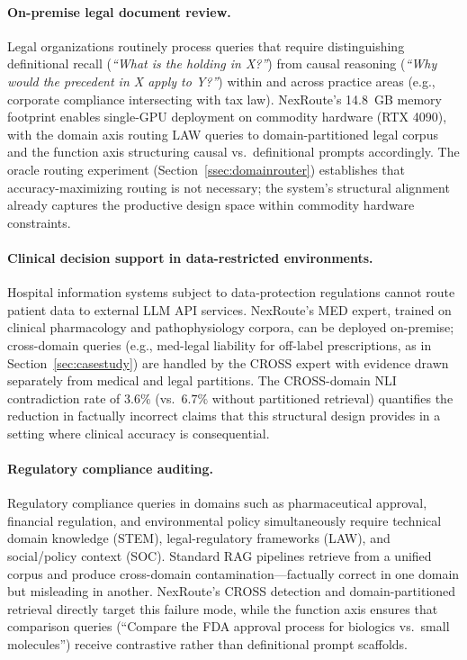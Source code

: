 \documentclass[a4paper,fleql,doubleblind]{cas-sc}
\begin{document}
\paragraph{On-premise legal document review.}
Legal organizations routinely process queries that require distinguishing definitional
recall (\textit{``What is the holding in X?''}) from causal reasoning
(\textit{``Why would the precedent in X apply to Y?''}) within and across practice
areas (e.g., corporate compliance intersecting with tax law).
NexRoute's 14.8~GB memory footprint enables single-GPU deployment on commodity hardware
(RTX 4090), with the domain axis routing LAW queries to domain-partitioned legal
corpus and the function axis structuring causal vs.\ definitional prompts
accordingly.
The oracle routing experiment (Section~\ref{ssec:domainrouter}) establishes that
accuracy-maximizing routing is not necessary; the system's structural alignment
already captures the productive design space within commodity hardware constraints.

\paragraph{Clinical decision support in data-restricted environments.}
Hospital information systems subject to data-protection regulations cannot route
patient data to external LLM API services.
NexRoute's MED expert, trained on clinical pharmacology and pathophysiology corpora,
can be deployed on-premise; cross-domain queries (e.g., med-legal liability for
off-label prescriptions, as in Section~\ref{sec:casestudy}) are handled by the
CROSS expert with evidence drawn separately from medical and legal partitions.
The CROSS-domain NLI contradiction rate of $3.6\%$ (vs.\ $6.7\%$ without partitioned
retrieval) quantifies the reduction in factually incorrect claims that this structural
design provides in a setting where clinical accuracy is consequential.

\paragraph{Regulatory compliance auditing.}
Regulatory compliance queries in domains such as pharmaceutical approval,
financial regulation, and environmental policy simultaneously require technical
domain knowledge (STEM), legal-regulatory frameworks (LAW), and social/policy
context (SOC). Standard RAG pipelines retrieve from a unified corpus and produce
cross-domain contamination---factually correct in one domain but misleading in
another. NexRoute's CROSS detection and domain-partitioned retrieval directly
target this failure mode, while the function axis ensures that comparison queries
(``Compare the FDA approval process for biologics vs.\ small molecules'') receive
contrastive rather than definitional prompt scaffolds.
\end{document}
